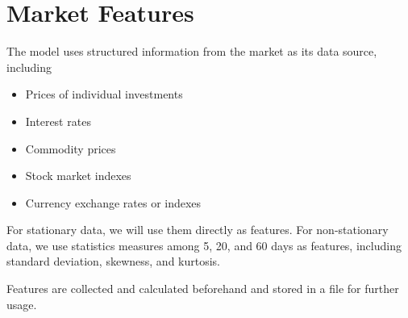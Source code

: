 \section{Market Features}
The model uses structured information from the market as its data source, including
\begin{itemize}
\itemsep -1em  
\item Prices of individual investments
\item Interest rates
\item Commodity prices
\item Stock market indexes
\item Currency exchange rates or indexes
\end{itemize}
\par
For stationary data, we will use them directly as features. For non-stationary data, we use statistics measures among 5, 20, and 60 days as features, including standard deviation, skewness, and kurtosis.
\par
Features are collected and calculated beforehand and stored in a file for further usage.